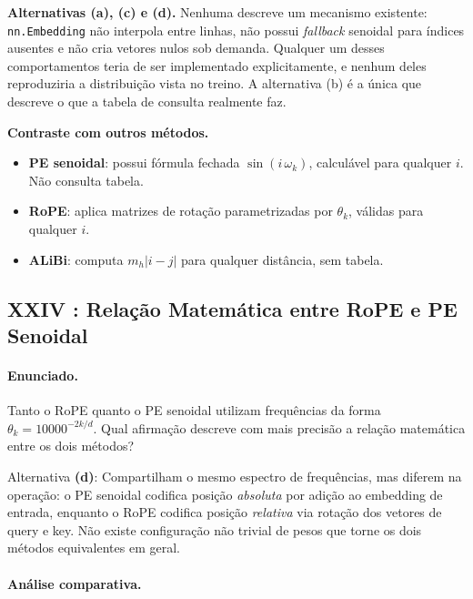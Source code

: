 \documentclass{dlproblemset}
\begin{document}
\textbf{Alternativas (a), (c) e (d).}
Nenhuma descreve um mecanismo existente: \texttt{nn.Embedding} não interpola entre
linhas, não possui \textit{fallback} senoidal para índices ausentes e não cria
vetores nulos sob demanda. Qualquer um desses comportamentos teria de ser
implementado explicitamente, e nenhum deles reproduziria a distribuição vista no
treino. A alternativa (b) é a única que descreve o que a tabela de consulta
realmente faz.

\textbf{Contraste com outros métodos.}
\begin{itemize}
  \item \textbf{PE senoidal}: possui fórmula fechada $\sin(i\,\omega_k)$, calculável
        para qualquer $i$. Não consulta tabela.
  \item \textbf{RoPE}: aplica matrizes de rotação parametrizadas por $\theta_k$,
        válidas para qualquer $i$.
  \item \textbf{ALiBi}: computa $m_h |i-j|$ para qualquer distância, sem tabela.
\end{itemize}

\subsection*{XXIV {\mdseries{}}: Relação Matemática entre RoPE e PE Senoidal}

\paragraph{Enunciado.}
Tanto o RoPE quanto o PE senoidal utilizam frequências da forma
$\theta_k = 10000^{-2k/d}$. Qual afirmação descreve com mais precisão a relação
matemática entre os dois métodos?

\begin{respostabox}
Alternativa \textbf{(d)}: Compartilham o mesmo espectro de frequências, mas diferem na
operação: o PE senoidal codifica posição \emph{absoluta} por adição ao
embedding de entrada, enquanto o RoPE codifica posição \emph{relativa} via rotação
dos vetores de query e key. Não existe configuração não trivial de pesos que torne
os dois métodos equivalentes em geral.
\end{respostabox}

\paragraph{Análise comparativa.}
\end{document}
